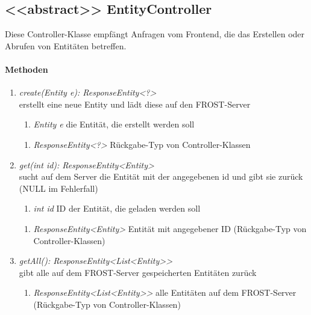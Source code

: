 \subsection*{<<abstract>> EntityController}\label{entCon}
Diese Controller-Klasse empfängt Anfragen vom Frontend, die das Erstellen oder Abrufen von Entitäten betreffen.

\paragraph{Methoden}

\begin{enumerate}[+]
	\item \textit{ create(Entity e): ResponseEntity<?> }\\
	erstellt eine neue Entity und lädt diese auf den FROST-Server
	
		\begin{enumerate}[$\bullet$]
			\item \textit{Entity e} die Entität, die erstellt werden soll

		\end{enumerate}
		\vspace{-0.2cm}
		\begin{enumerate}[$\circ$]
			\item \textit{ResponseEntity<?>} Rückgabe-Typ von Controller-Klassen
		\end{enumerate}
	
	\item \textit{ get(int id): ResponseEntity<Entity> }\\
	sucht auf dem Server die Entität mit der angegebenen id und gibt sie zurück (NULL im Fehlerfall)
	
		\begin{enumerate}[$\bullet$]
			\item \textit{int id} ID der Entität, die geladen werden soll
		
		\end{enumerate}
		\vspace{-0.2cm}
		\begin{enumerate}[$\circ$]
			\item \textit{ResponseEntity<Entity>} Entität mit angegebener ID (Rückgabe-Typ von Controller-Klassen)
		\end{enumerate}
	\item \textit{ getAll(): ResponseEntity<List<Entity>> }\\
	gibt alle auf dem FROST-Server gespeicherten Entitäten zurück
	
	\begin{enumerate}[$\circ$]
		\item \textit{ResponseEntity<List<Entity>>} alle Entitäten auf dem FROST-Server (Rückgabe-Typ von Controller-Klassen)
	\end{enumerate}


\end{enumerate}	

